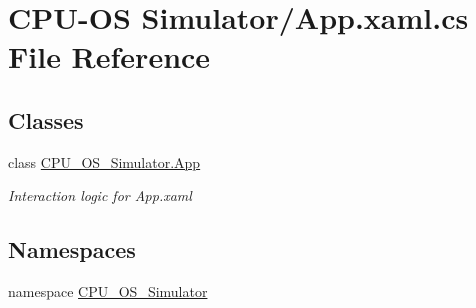 \hypertarget{_c_p_u-_o_s_01_simulator_2_app_8xaml_8cs}{}\section{C\+P\+U-\/\+O\+S Simulator/\+App.xaml.\+cs File Reference}
\label{_c_p_u-_o_s_01_simulator_2_app_8xaml_8cs}
\subsection*{Classes}
\begin{DoxyCompactItemize}
\item 
class \hyperlink{class_c_p_u___o_s___simulator_1_1_app}{C\+P\+U\+\_\+\+O\+S\+\_\+\+Simulator.\+App}
\begin{DoxyCompactList}\small\item\em Interaction logic for App.\+xaml \end{DoxyCompactList}\end{DoxyCompactItemize}
\subsection*{Namespaces}
\begin{DoxyCompactItemize}
\item 
namespace \hyperlink{namespace_c_p_u___o_s___simulator}{C\+P\+U\+\_\+\+O\+S\+\_\+\+Simulator}
\end{DoxyCompactItemize}

